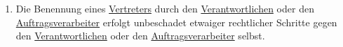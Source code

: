 \begin{enumerate}
  \item Die Benennung eines \hyperref[itm:04-17]{Vertreters} durch den \hyperref[itm:04-7]{Verantwortlichen} oder
   den \hyperref[itm:04-8]{Auftragsverarbeiter} erfolgt unbeschadet etwaiger rechtlicher Schritte gegen den \hyperref
   [itm:04-7]{Verantwortlichen} oder den \hyperref[itm:04-8]{Auftragsverarbeiter} selbst.%
  \label{itm:27-5}

\end{enumerate}


